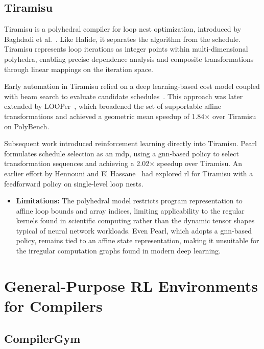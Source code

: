 \subsection{Tiramisu}
Tiramisu is a polyhedral compiler for loop nest optimization, introduced by Baghdadi et al.~\cite{baghdadi2018tiramisu}. Like Halide, it separates the algorithm from the schedule. Tiramisu represents loop iterations as integer points within multi-dimensional polyhedra, enabling precise dependence analysis and composite transformations through linear mappings on the iteration space.

Early automation in Tiramisu relied on a deep learning-based cost model coupled with beam search to evaluate candidate schedules~\cite{baghdadi2021deep}. This approach was later extended by LOOPer~\cite{merouani2024looper}, which broadened the set of supportable affine transformations and achieved a geometric mean speedup of 1.84$\times$ over Tiramisu on PolyBench.

Subsequent work introduced reinforcement learning directly into Tiramisu. Pearl~\cite{lamouri2025pearl} formulates schedule selection as an \gls{mdp}, using a \gls{gnn}-based policy to select transformation sequences and achieving a 2.02$\times$ speedup over Tiramisu. An earlier effort by Hennouni and El Hassane~\cite{henouni2022utilisation} had explored \gls{rl} for Tiramisu with a feedforward policy on single-level loop nests.

\begin{itemize}
\item \textbf{Limitations:} The polyhedral model restricts program representation to affine loop bounds and array indices, limiting applicability to the regular kernels found in scientific computing rather than the dynamic tensor shapes typical of neural network workloads. Even Pearl, which adopts a \gls{gnn}-based policy, remains tied to an affine state representation, making it unsuitable for the irregular computation graphs found in modern deep learning.
\end{itemize}

\section{General-Purpose RL Environments for Compilers}

\subsection{CompilerGym}

